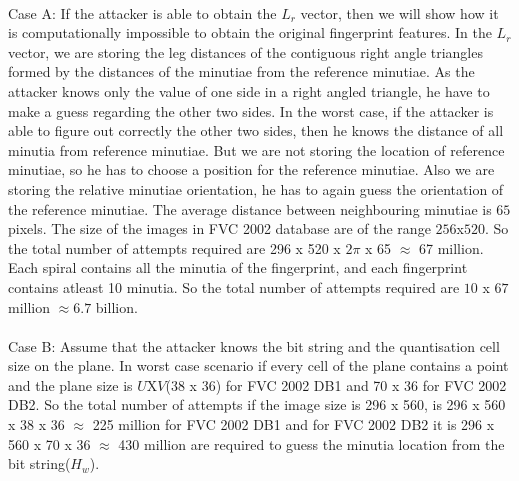 \documentclass[14pt, oneside]{article}   	%
\begin{document}
\paragraph{}
Case A: If the attacker is able to obtain the $L_r$ vector, then we will show how it is computationally impossible to obtain the original fingerprint features. In the $L_r$ vector, we are storing the leg distances of the contiguous right angle triangles formed by the distances of the minutiae from the reference minutiae. As the attacker knows only the value of one side in a right angled triangle, he have to make a guess regarding the other two sides. In the worst case, if the attacker is able to figure out correctly the other two sides, then he knows the distance of all minutia from reference minutiae. But we are not storing the location of reference minutiae, so he has to choose a position for the reference minutiae. Also we are storing the relative minutiae orientation, he has to again guess the orientation of the reference minutiae. The average distance between neighbouring minutiae is $65$ pixels. The size of the images in FVC 2002 database are of the range $256$x$520$. So the total number of attempts required are 296 x 520 x $2\pi$ x 65 $\approx$ 67 million. Each spiral contains all the minutia of the fingerprint, and each fingerprint contains atleast 10 minutia. So the total number of attempts required are $10$ x $67$ million $\approx 6.7$ billion.
\paragraph{}
Case B: Assume that the attacker knows the bit string and the quantisation cell size on the plane. In worst case scenario if every cell of the plane contains a point and the plane size is $U$X$V$(38 x 36) for FVC 2002 DB1 and 70 x 36 for FVC 2002 DB2. So the total number of attempts if the image size is 296 x 560, is 296 x 560 x 38 x 36 $\approx$ 225 million for FVC 2002 DB1 and for FVC 2002 DB2 it is 296 x 560 x 70 x 36 $\approx$ 430 million are required to guess the minutia location from the bit string($H_w$).
\end{document}
